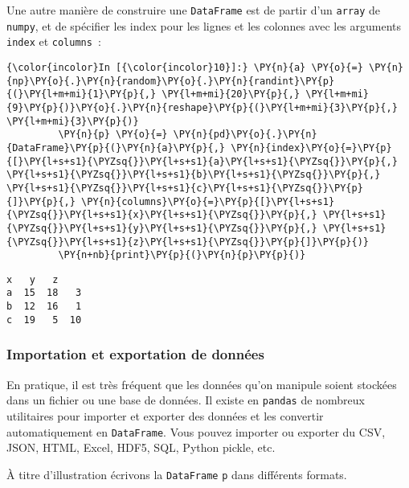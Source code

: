     Une autre manière de construire une \texttt{DataFrame} est de partir
d'un \texttt{array} de \texttt{numpy}, et de spécifier les index pour
les lignes et les colonnes avec les arguments \texttt{index} et
\texttt{columns}~:

    \begin{Verbatim}[commandchars=\\\{\},frame=single,framerule=0.3mm,rulecolor=\color{cellframecolor}]
{\color{incolor}In [{\color{incolor}10}]:} \PY{n}{a} \PY{o}{=} \PY{n}{np}\PY{o}{.}\PY{n}{random}\PY{o}{.}\PY{n}{randint}\PY{p}{(}\PY{l+m+mi}{1}\PY{p}{,} \PY{l+m+mi}{20}\PY{p}{,} \PY{l+m+mi}{9}\PY{p}{)}\PY{o}{.}\PY{n}{reshape}\PY{p}{(}\PY{l+m+mi}{3}\PY{p}{,} \PY{l+m+mi}{3}\PY{p}{)}
         \PY{n}{p} \PY{o}{=} \PY{n}{pd}\PY{o}{.}\PY{n}{DataFrame}\PY{p}{(}\PY{n}{a}\PY{p}{,} \PY{n}{index}\PY{o}{=}\PY{p}{[}\PY{l+s+s1}{\PYZsq{}}\PY{l+s+s1}{a}\PY{l+s+s1}{\PYZsq{}}\PY{p}{,} \PY{l+s+s1}{\PYZsq{}}\PY{l+s+s1}{b}\PY{l+s+s1}{\PYZsq{}}\PY{p}{,} \PY{l+s+s1}{\PYZsq{}}\PY{l+s+s1}{c}\PY{l+s+s1}{\PYZsq{}}\PY{p}{]}\PY{p}{,} \PY{n}{columns}\PY{o}{=}\PY{p}{[}\PY{l+s+s1}{\PYZsq{}}\PY{l+s+s1}{x}\PY{l+s+s1}{\PYZsq{}}\PY{p}{,} \PY{l+s+s1}{\PYZsq{}}\PY{l+s+s1}{y}\PY{l+s+s1}{\PYZsq{}}\PY{p}{,} \PY{l+s+s1}{\PYZsq{}}\PY{l+s+s1}{z}\PY{l+s+s1}{\PYZsq{}}\PY{p}{]}\PY{p}{)}
         \PY{n+nb}{print}\PY{p}{(}\PY{n}{p}\PY{p}{)}
\end{Verbatim}


    \begin{Verbatim}[commandchars=\\\{\},frame=single,framerule=0.3mm,rulecolor=\color{cellframecolor}]
    x   y   z
a  15  18   3
b  12  16   1
c  19   5  10
\end{Verbatim}

    \hypertarget{importation-et-exportation-de-donnuxe9es}{%
\subsubsection{Importation et exportation de
données}\label{importation-et-exportation-de-donnuxe9es}}

    En pratique, il est très fréquent que les données qu'on manipule soient
stockées dans un fichier ou une base de données. Il existe en
\texttt{pandas} de nombreux utilitaires pour importer et exporter des
données et les convertir automatiquement en \texttt{DataFrame}. Vous
pouvez importer ou exporter du CSV, JSON, HTML, Excel, HDF5, SQL, Python
pickle, etc.

    À titre d'illustration écrivons la \texttt{DataFrame} \texttt{p} dans
différents formats.

